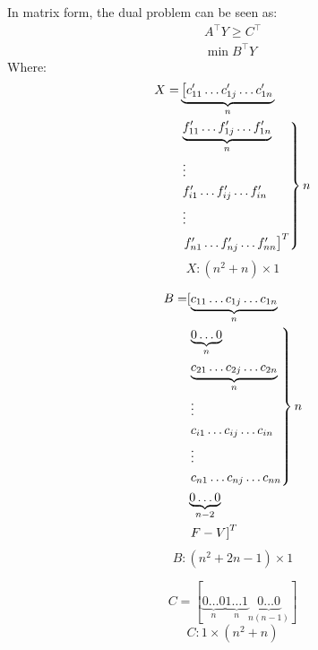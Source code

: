 In matrix form, the dual problem can be seen as:
\begin{equation*}
\begin{gathered}
  A^\intercal Y \geq C^\intercal \\
  \min{B^\intercal Y}
\end{gathered}
\end{equation*}
Where:
\begin{align*}
  X = &\underbrace{\left[c'_{11} \dots c'_{1j} \dots c'_{1n} \right.}_{n} \\
    &\begin{rcases}
      \underbrace{f'_{11} \dots f'_{1j} \dots f'_{1n}}_{n} \\
      \vdots \\
      f'_{i1} \dots f'_{ij} \dots f'_{in} \\
      \vdots \\
      \left. f'_{n1} \dots f'_{nj} \dots f'_{nn} \right]^T
    \end{rcases} n
\end{align*}
\begin{equation*}
  X : \left(n^2 + n\right) \times 1
\end{equation*}

\begin{align*}
  B = &[\underbrace{c_{11} \dots c_{1j} \dots c_{1n}}_{n} \\
    &\begin{rcases}
      \underbrace{0 \dots 0}_{n} \\
      \underbrace{c_{21} \dots c_{2j} \dots c_{2n}}_{n} \\
      \vdots \\
      c_{i1} \dots c_{ij} \dots c_{in} \\
      \vdots \\
      c_{n1} \dots c_{nj} \dots c_{nn}
    \end{rcases} n \\
    &\underbrace{0 \dots 0}_{n-2} \\
    &\left. F - V \right]^T
\end{align*}
\begin{equation*}
  B : \left(n^2 + 2n - 1\right) \times 1
\end{equation*}

\begin{equation*}
  C = [\underbrace{0 \dots 0}_{n}
      \underbrace{1 \dots 1}_{n}
      \underbrace{0 \dots 0}_{n\left(n - 1\right)}]
\end{equation*}
\begin{equation*}
  C : 1 \times \left(n^2 + n\right)
\end{equation*}

